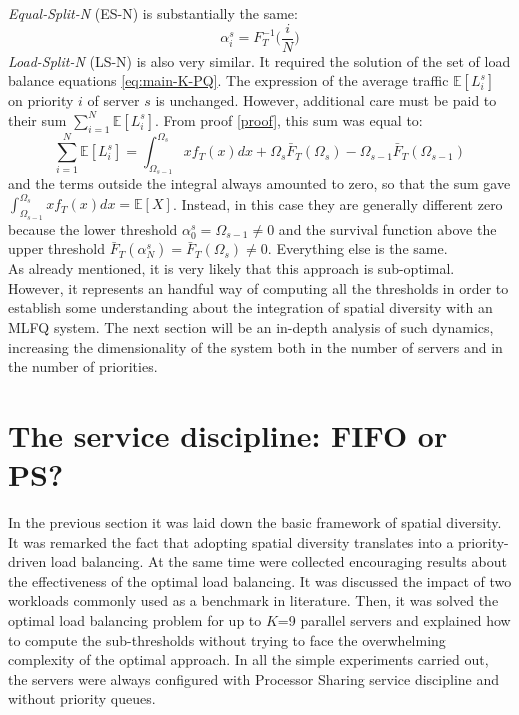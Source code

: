 \textit{Equal-Split-N} (ES-N) is substantially the same:
\begin{equation}
\alpha_i^s = F_T^{-1}\Big(\frac{i}{N}\Big)
\end{equation}
\textit{Load-Split-N} (LS-N) is also very similar. It required the solution of the set of load balance equations \ref{eq:main-K-PQ}. The expression of the average traffic $\mathbb{E}[L_i^s]$ on priority $i$ of server $s$ is unchanged. However, additional care must be paid to their sum $\sum_{i=1}^{N}\mathbb{E}[L_i^s]$. From proof \ref{proof}, this sum was equal to:
\[
\sum_{i=1}^{N}\mathbb{E}[L_i^s] = \int_{\Omega_{s-1}}^{\Omega_s}xf_T(x)dx + \Omega_{s} \bar{F}_T(\Omega_{s}) -\Omega_{s-1}\bar{F}_T(\Omega_{s-1})
\]
and the terms outside the integral always amounted to zero, so that the sum gave $\int_{\Omega_{s-1}}^{\Omega_s}xf_T(x)dx = \mathbb{E}[X]$. Instead, in this case they are generally different zero because the lower threshold $\alpha_0^s = \Omega_{s-1} \neq 0$ and the survival function above the upper threshold $\bar{F}_T(\alpha_N^s) = \bar{F}_T(\Omega_s) \neq 0$. Everything else is the same.
\\

As already mentioned, it is very likely that this approach is sub-optimal. However, it represents an handful way of computing all the thresholds in order to establish some understanding about the integration of spatial diversity with an MLFQ system. The next section will be an in-depth analysis of such dynamics, increasing the dimensionality of the system both in the number of servers and in the number of priorities.

\section{The service discipline: FIFO or PS?}
In the previous section it was laid down the basic framework of spatial diversity. It was remarked the fact that adopting spatial diversity translates into a priority-driven load balancing. At the same time were collected encouraging results about the effectiveness of the optimal load balancing. It was discussed the impact of two workloads commonly used as a benchmark in literature. Then, it was solved the optimal load balancing problem for up to $K$=9 parallel servers and explained how to compute the sub-thresholds without trying to face the overwhelming complexity of the optimal approach. In all the simple experiments carried out, the servers were always configured with Processor Sharing service discipline and without priority queues.

